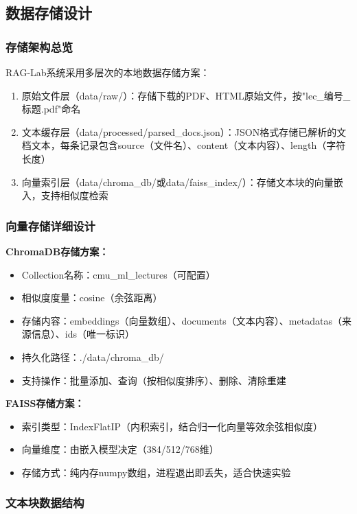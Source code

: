\documentclass[10pt,a4paper]{article}
\begin{document}
\subsection{数据存储设计}

\subsubsection{存储架构总览}

RAG-Lab系统采用多层次的本地数据存储方案：
\begin{enumerate}[label=(\arabic*)]
\item 原始文件层（data/raw/）：存储下载的PDF、HTML原始文件，按"lec\_编号\_标题.pdf"命名
\item 文本缓存层（data/processed/parsed\_docs.json）：JSON格式存储已解析的文档文本，每条记录包含source（文件名）、content（文本内容）、length（字符长度）
\item 向量索引层（data/chroma\_db/或data/faiss\_index/）：存储文本块的向量嵌入，支持相似度检索
\end{enumerate}

\subsubsection{向量存储详细设计}

\textbf{ChromaDB存储方案：}
\begin{itemize}
\item Collection名称：cmu\_ml\_lectures（可配置）
\item 相似度度量：cosine（余弦距离）
\item 存储内容：embeddings（向量数组）、documents（文本内容）、metadatas（来源信息）、ids（唯一标识）
\item 持久化路径：./data/chroma\_db/
\item 支持操作：批量添加、查询（按相似度排序）、删除、清除重建
\end{itemize}

\textbf{FAISS存储方案：}
\begin{itemize}
\item 索引类型：IndexFlatIP（内积索引，结合归一化向量等效余弦相似度）
\item 向量维度：由嵌入模型决定（384/512/768维）
\item 存储方式：纯内存numpy数组，进程退出即丢失，适合快速实验
\end{itemize}

\subsubsection{文本块数据结构}
\end{document}
